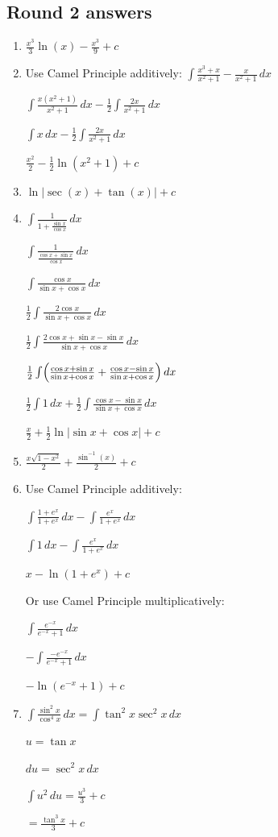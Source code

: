 \documentclass[12pt, letterpaper]{article}
\begin{document}
\subsection*{Round 2 answers}
\begin{enumerate}[itemsep=1cm]
    \item 
    $\frac{x^3}{3}\ln(x)-\frac{x^3}{9}+c$

    \item 
    Use Camel Principle additively:
    $\int \frac{x^3+x}{x^2 +1} - \frac{x}{x^2 +1}\,dx$

    $\int \frac{x(x^2+1)}{x^2 +1}\,dx - \frac{1}{2}\int \frac{2x}{x^2 +1}\,dx$

    $\int x\,dx - \frac{1}{2}\int \frac{2x}{x^2 +1}\,dx$
    
    $\frac{x^2}{2}-\frac{1}{2}\ln(x^2 + 1)+c$

    \item
    $\ln{|\sec(x)+\tan(x)|}+c$

    \item
    $\int \frac{1}{1+\frac{\sin{x}}{\cos{x}}}\,dx$

    $\int \frac{1}{\frac{\cos{x}+\sin{x}}{\cos{x}}}\,dx$

    $\int \frac{\cos{x}}{\sin{x}+\cos{x}}\,dx$

    $\frac{1}{2}\int \frac{2\cos{x}}{\sin{x}+\cos{x}}\,dx$

    $\frac{1}{2}\int \frac{2\cos{x}+\sin{x}-\sin{x}}{\sin{x}+\cos{x}}\,dx$

    $\frac{1}{2}\int \Bigl(\frac{\cos{x}+\sin{x}}{\sin{x}+\cos{x}}+\frac{\cos{x}-\sin{x}}{\sin{x}+\cos{x}}\Bigr)\,dx$
    
    $\frac{1}{2}\int 1\,dx+\frac{1}{2}\int \frac{\cos{x}-\sin{x}}{\sin{x}+\cos{x}}\,dx$
    
    $\frac{x}{2}+\frac{1}{2}\ln{|\sin{x}+\cos{x}|}+c$

    \item
    $\frac{x\sqrt{1-x^2}}{2}+\frac{\sin^{-1}(x)}{2}+c$

    \item
    Use Camel Principle additively:

    $\int \frac{1+e^x}{1+e^x}\,dx - \int \frac{e^x}{1+e^x}\,dx$

    $\int 1\,dx - \int \frac{e^x}{1+e^x}\,dx$

    $x-\ln(1+e^x)+c$

    Or use Camel Principle multiplicatively:

    $\int \frac{e^{-x}}{e^{-x}+1}\,dx$

    $-\int \frac{-e^{-x}}{e^{-x}+1}\,dx$

    $-\ln(e^{-x}+1)+c$

    \item
    $\int \frac{\sin^2{x}}{\cos^4{x}}\,dx = \int \tan^2{x}\sec^2{x}\,dx$

    $u=\tan{x}$

    $du=\sec^2{x}\,dx$

    $\int u^2\,du = \frac{u^3}{3}+c$

    $=\frac{\tan^3{x}}{3}+c$
\end{enumerate}
\pagebreak
\end{document}
